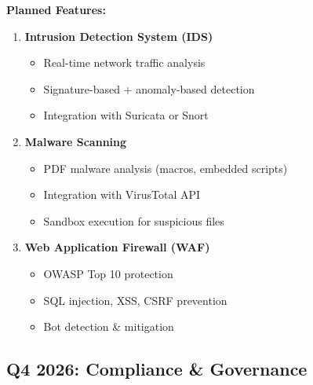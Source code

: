 \textbf{Planned Features:}
\begin{enumerate}
    \item \textbf{Intrusion Detection System (IDS)}
    \begin{itemize}
        \item Real-time network traffic analysis
        \item Signature-based + anomaly-based detection
        \item Integration with Suricata or Snort
    \end{itemize}
    
    \item \textbf{Malware Scanning}
    \begin{itemize}
        \item PDF malware analysis (macros, embedded scripts)
        \item Integration with VirusTotal API
        \item Sandbox execution for suspicious files
    \end{itemize}
    
    \item \textbf{Web Application Firewall (WAF)}
    \begin{itemize}
        \item OWASP Top 10 protection
        \item SQL injection, XSS, CSRF prevention
        \item Bot detection \& mitigation
    \end{itemize}
\end{enumerate}

\subsection{Q4 2026: Compliance \& Governance}

